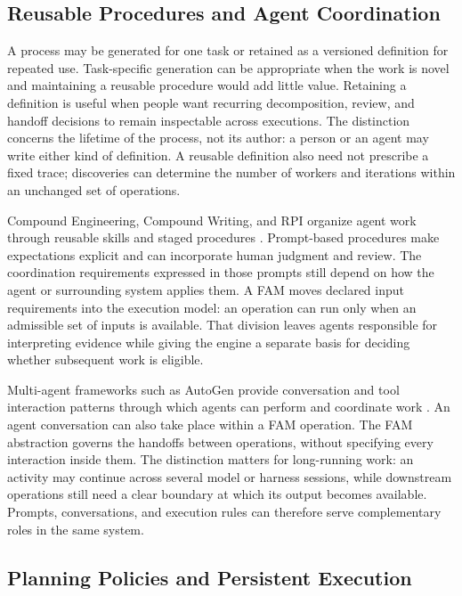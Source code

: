 \documentclass[letterpaper]{article}
\theoremstyle{definition}
\begin{document}
\subsection{Reusable Procedures and Agent Coordination}

A process may be generated for one task or retained as a versioned definition
for repeated use. Task-specific generation can be appropriate when the work is
novel and maintaining a reusable procedure would add little value. Retaining
a definition is useful when people want recurring decomposition, review, and
handoff decisions to remain inspectable across executions. The distinction
concerns the lifetime of the process, not its author: a person or an agent may
write either kind of definition. A reusable definition also need not prescribe
a fixed trace; discoveries can determine the number of workers and iterations
within an unchanged set of operations.

Compound Engineering, Compound Writing, and RPI organize agent work through
reusable skills and staged procedures
\cite{everyCompoundEngineering,everyCompoundWriting,dex2025context}.
Prompt-based procedures make expectations explicit and can incorporate human
judgment and review. The coordination requirements expressed in those prompts
still depend on how the agent or surrounding system applies them. A FAM moves
declared input requirements into the execution model: an operation can run
only when an admissible set of inputs is available. That division leaves
agents responsible for interpreting evidence while giving the engine a
separate basis for deciding whether subsequent work is eligible.

Multi-agent frameworks such as AutoGen provide conversation and tool
interaction patterns through which agents can perform and coordinate work
\cite{wu2024autogen}. An agent conversation can also take place within a FAM
operation. The FAM abstraction governs the handoffs between operations,
without specifying every interaction inside them. The distinction matters
for long-running work: an activity may continue across several model or
harness sessions, while downstream operations still need a clear boundary
at which its output becomes available. Prompts, conversations, and execution
rules can therefore serve complementary roles in the same system.

\subsection{Planning Policies and Persistent Execution}
\end{document}
